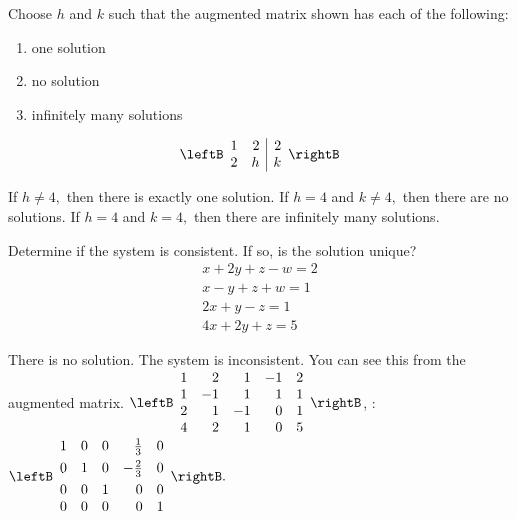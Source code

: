 \begin{enumialphparenastyle}
\begin{ex}
Choose $h$ and $k$ such that the augmented matrix shown has each of the following: 
\begin{enumerate}
\item one solution
\item no solution
\item infinitely many solutions
\end{enumerate}
\begin{equation*}
\leftB
\begin{array}{rr|r}
1 & 2 & 2 \\
2 & h & k
\end{array}
\rightB 
\end{equation*}
\begin{sol}
If $h\neq 4,$ then there is exactly one solution. If $h=4$ and $k\neq 4,$
then there are no solutions. If $h=4$ and $k=4,$ then there are infinitely
many solutions.
\end{sol}
\end{ex}


\begin{ex}
Determine if the system is consistent. If so, is the solution unique?
\begin{equation*}
\begin{array}{c}
x+2y+z-w=2 \\
x-y+z+w=1 \\
2x+y-z=1 \\
4x+2y+z=5
\end{array}
\end{equation*}
\begin{sol}
There is no solution. The system is inconsistent. You can see this from the
augmented matrix. $\leftB
\begin{array}{rrrrr}
1 & 2 & 1 & -1 & 2 \\
1 & -1 & 1 & 1 & 1 \\
2 & 1 & -1 & 0 & 1 \\
4 & 2 & 1 & 0 & 5
\end{array}
\rightB $, \rref: $\leftB
\begin{array}{rrrrr}
1 & 0 & 0 & \vspace{0.05in}\frac{1}{3} & 0 \\
0 & 1 & 0 & -\vspace{0.05in}\frac{2}{3} & 0 \\
0 & 0 & 1 & 0 & 0 \\
0 & 0 & 0 & 0 & 1
\end{array}
\rightB .$
\end{sol}
\end{ex}


\end{enumialphparenastyle}

